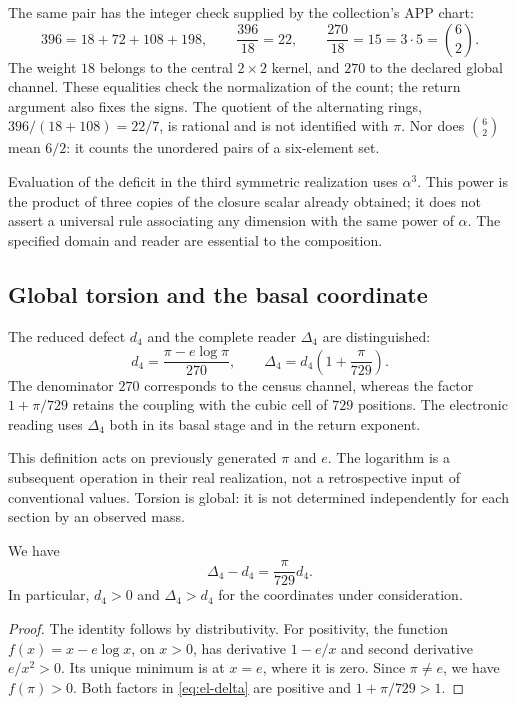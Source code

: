 The same pair has the integer check supplied by the collection's APP chart:
\begin{equation}
 396=18+72+108+198,
 \qquad \frac{396}{18}=22,
 \qquad \frac{270}{18}=15=3\cdot5=\binom62.
 \label{eq:el-censo}
\end{equation}
The weight \(18\) belongs to the central \(2\times2\) kernel, and \(270\)
to the declared global channel. These equalities check the normalization
of the count; the return argument also fixes the signs. The
quotient of the alternating rings,
\(396/(18+108)=22/7\), is rational and is not identified with \(\pi\).
Nor does \(\binom62\) mean \(6/2\): it counts the unordered pairs
of a six-element set.

Evaluation of the deficit in the third symmetric realization uses
\(\alpha^3\). This power is the product of three copies of the
closure scalar already obtained; it does not assert a universal rule
associating any dimension with the same power of \(\alpha\).
The specified domain and reader are essential to the composition.

\subsection{Global torsion and the basal coordinate}

\begin{definition}
The reduced defect \(d_4\) and the complete reader
\(\Delta_4\) are distinguished:
\begin{equation}
 d_4=\frac{\pi-e\log\pi}{270},\qquad
 \Delta_4=d_4\left(1+\frac{\pi}{729}\right).
 \label{eq:el-delta}
\end{equation}
The denominator \(270\) corresponds to the census channel, whereas the
factor \(1+\pi/729\) retains the coupling with the cubic cell of
\(729\) positions. The electronic reading uses \(\Delta_4\) both in
its basal stage and in the return exponent.
\end{definition}

This definition acts on previously generated \(\pi\) and \(e\). The
logarithm is a subsequent operation in their real realization, not a
retrospective input of conventional values. Torsion is global:
it is not determined independently for each section by an observed
mass.

\begin{lemma}
We have
\begin{equation}
 \Delta_4-d_4=\frac{\pi}{729}d_4.
 \label{eq:el-delta-diferencia}
\end{equation}
In particular, \(d_4>0\) and \(\Delta_4>d_4\) for the coordinates
under consideration.
\end{lemma}
\begin{proof}
The identity follows by distributivity. For positivity, the function
\(f(x)=x-e\log x\), on \(x>0\), has derivative \(1-e/x\) and
second derivative \(e/x^2>0\). Its unique minimum is at \(x=e\), where
it is zero. Since \(\pi\ne e\), we have \(f(\pi)>0\). Both factors
in \eqref{eq:el-delta} are positive and \(1+\pi/729>1\).
\end{proof}


